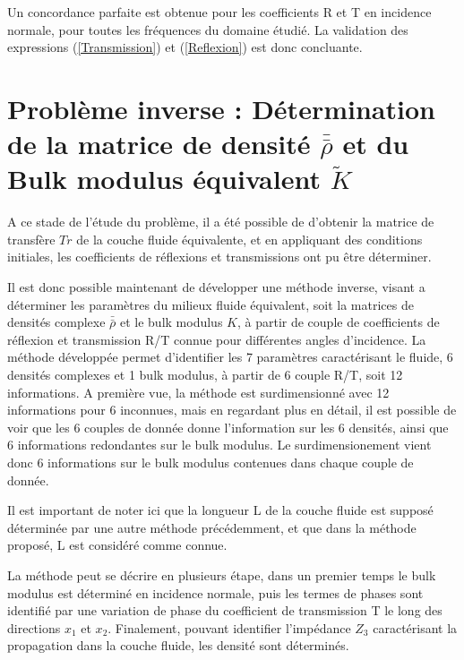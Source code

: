 \documentclass[12pt]{report}
\begin{document}
    Un concordance parfaite est obtenue pour les coefficients R et T en incidence normale, pour toutes les fréquences du domaine étudié. La validation des expressions (\ref{Transmission}) et (\ref{Reflexion}) est donc concluante. 

\chapter{Problème inverse : Détermination de la matrice de densité $\bar{\bar{\rho}}$ et du Bulk modulus équivalent $\tilde{K}$}
\label{Ch_Inv}
	A ce stade de l'étude du problème, il a été possible de d'obtenir la matrice de transfère $Tr$ de la couche fluide équivalente, et en appliquant des conditions initiales, les coefficients de réflexions et transmissions ont pu être déterminer.
	
	Il est donc possible maintenant de développer une méthode inverse, visant a déterminer les paramètres du milieux fluide équivalent, soit la matrices de densités complexe $\bar{\bar{\rho}}$ et le bulk modulus $K$, à partir de couple de coefficients de réflexion et transmission R/T connue pour différentes angles d'incidence.
	La méthode développée permet d'identifier les 7 paramètres caractérisant le fluide, 6 densités complexes et 1 bulk modulus, à partir de 6 couple R/T, soit 12 informations. A première vue, la méthode est surdimensionné avec 12 informations pour 6 inconnues, mais en regardant plus en détail, il est possible de voir que les 6 couples de donnée donne l'information sur les 6 densités, ainsi que 6 informations redondantes sur le bulk modulus. Le surdimensionement vient donc 6 informations sur le bulk modulus contenues dans chaque couple de donnée. 
    
    Il est important de noter ici que la longueur L de la couche fluide est supposé déterminée par une autre méthode précédemment, et que dans la méthode proposé, L est considéré comme connue.
    
    La méthode peut se décrire en plusieurs étape, dans un premier temps le bulk modulus est déterminé en incidence normale, puis les termes de phases sont identifié par une variation de phase du coefficient de transmission T le long des directions $x_1$ et $x_2$. Finalement, pouvant identifier l'impédance $Z_3$ caractérisant la propagation dans la couche fluide, les densité sont déterminés.
    
\end{document}

